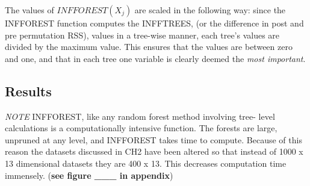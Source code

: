 \documentclass[12pt,twoside]{reedthesis}
\begin{document}
  The values of \(INFFOREST(X_j)\) are scaled in the following way: since
  the INFFOREST function computes the INFFTREES, (or the difference in
  post and pre permutation RSS), values in a tree-wise manner, each tree's
  values are divided by the maximum value. This ensures that the values
  are between zero and one, and that in each tree one variable is clearly
  deemed the \emph{most important}.
  
  \subsection{Results}\label{results}
  
  \emph{NOTE} INFFOREST, like any random forest method involving tree-
  level calculations is a computationally intensive function. The forests
  are large, unpruned at any level, and INFFOREST takes time to compute.
  Because of this reason the datasets discussed in CH2 have been altered
  so that instead of 1000 x 13 dimensional datasets they are 400 x 13.
  This decreases computation time immensely. (\textbf{see figure \_\_\_ in
  appendix})
  
\end{document}
